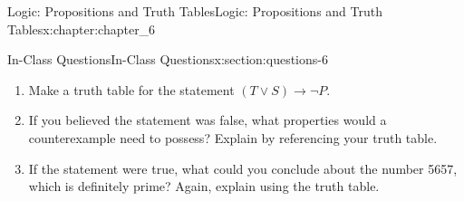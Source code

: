 \documentclass[oneside,10pt,]{book}
\numberwithin{equation}{section}
\begin{document}
\begin{chapterptx}{Logic: Propositions and Truth Tables}{}{Logic: Propositions and Truth Tables}{}{}{x:chapter:chapter_6}
\begin{sectionptx}{In-Class Questions}{}{In-Class Questions}{}{}{x:section:questions-6}
\begin{enumerate}[label=\arabic*.]
\begin{enumerate}[label=(\alph*)]
\item{}Make a truth table for the statement \((T \vee S) \rightarrow \neg P\).%
\item{}If you believed the statement was false, what properties would a counterexample need to possess? Explain by referencing your truth table.%
\item{}If the statement were true, what could you conclude about the number 5657, which is definitely prime? Again, explain using the truth table.%
\end{enumerate}
%
\end{enumerate}
%
\end{sectionptx}
\end{chapterptx}
%
%
\typeout{************************************************}
\typeout{************************************************}
%
\end{document}

